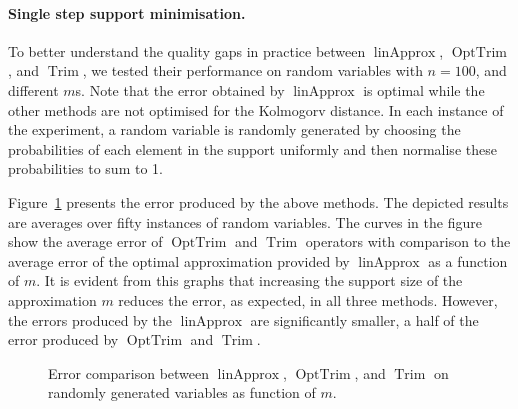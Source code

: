 \documentclass[letterpaper]{article} %
\DeclareMathOperator{\Trim}{Trim}
\DeclareMathOperator{\KlmApprox}{linApprox}
\DeclareMathOperator{\OptTrim}{OptTrim}
\begin{document}
\paragraph{Single step support minimisation.}
To better understand the quality gaps in practice between $\KlmApprox$, $\OptTrim$, and $\Trim$, we tested their performance on random variables with $n{=}100$, and different $m$s. Note that the error obtained by $\KlmApprox$ is optimal while the other methods are not optimised for the Kolmogorv distance. In each instance of the experiment, a random variable is randomly generated by choosing the probabilities of each element in the support uniformly and then normalise these probabilities to sum to 1.

Figure~\ref{fig:error} presents the error produced by the above methods. The depicted results are averages over fifty instances of random variables. The curves in the figure show the average error of $\OptTrim$ and $\Trim$ operators with comparison to the average error of the optimal approximation provided by $\KlmApprox$ as a function of $m$. It is evident from this graphs that increasing the support size of the approximation $m$ reduces the error, as expected, in all three methods. However, the errors produced by the $\KlmApprox$ are significantly smaller, a half of the error produced by $\OptTrim$ and $\Trim$.


\begin{figure}[htb]
	\scriptsize	
	\centering 
	\caption{Error comparison between $\KlmApprox$, $\OptTrim$, and $\Trim$ on randomly generated variables as function of $m$.}
	\label{fig:error}
\end{figure}
\end{document}
